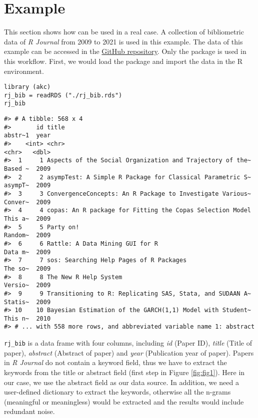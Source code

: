 \hypertarget{example}{%
\section{Example}\label{example}}

This section shows how  can be used in a real case. A collection of bibliometric data of \emph{R Journal} from 2009 to 2021 is used in this example. The data of this example can be accessed in the \href{https://github.com/hope-data-science/RJ_akc}{GitHub repository}. Only the  package is used in this workflow. First, we would load the package and import the data in the R environment.

\begin{verbatim}
library (akc)
rj_bib = readRDS ("./rj_bib.rds")
rj_bib
\end{verbatim}

\begin{verbatim}
#> # A tibble: 568 x 4
#>       id title                                                     abstr~1  year
#>    <int> <chr>                                                     <chr>   <dbl>
#>  1     1 Aspects of the Social Organization and Trajectory of the~ Based ~  2009
#>  2     2 asympTest: A Simple R Package for Classical Parametric S~ asympT~  2009
#>  3     3 ConvergenceConcepts: An R Package to Investigate Various~ Conver~  2009
#>  4     4 copas: An R package for Fitting the Copas Selection Model This a~  2009
#>  5     5 Party on!                                                 Random~  2009
#>  6     6 Rattle: A Data Mining GUI for R                           Data m~  2009
#>  7     7 sos: Searching Help Pages of R Packages                   The so~  2009
#>  8     8 The New R Help System                                     Versio~  2009
#>  9     9 Transitioning to R: Replicating SAS, Stata, and SUDAAN A~ Statis~  2009
#> 10    10 Bayesian Estimation of the GARCH(1,1) Model with Student~ This n~  2010
#> # ... with 558 more rows, and abbreviated variable name 1: abstract
\end{verbatim}

\texttt{rj\_bib} is a data frame with four columns, including \emph{id} (Paper ID), \emph{title} (Title of paper), \emph{abstract} (Abstract of paper) and \emph{year} (Publication year of paper). Papers in \emph{R Journal} do not contain a keyword field, thus we have to extract the keywords from the title or abstract field (first step in Figure \ref{fig:fig1}). Here in our case, we use the abstract field as our data source. In addition, we need a user-defined dictionary to extract the keywords, otherwise all the n-grams (meaningful or meaningless) would be extracted and the results would include redundant noise.

